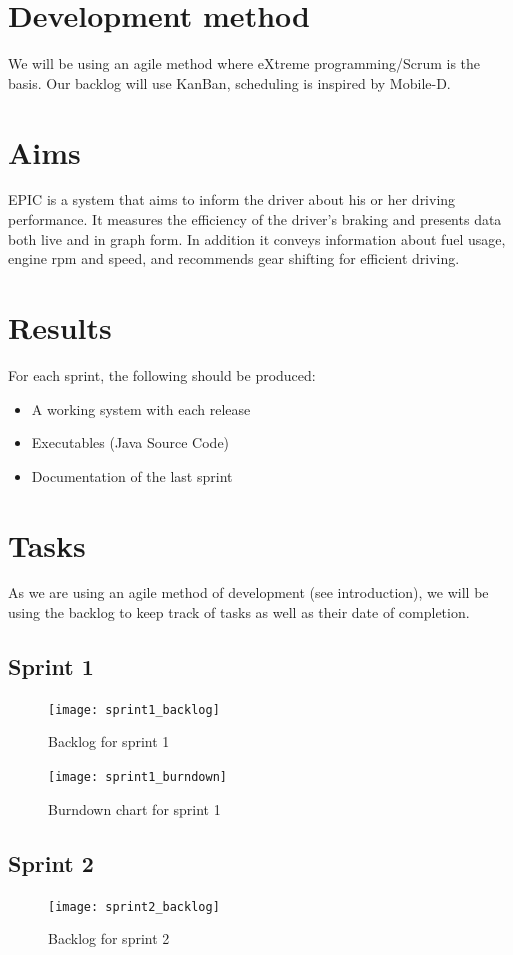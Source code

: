 \documentclass[a4paper,12pt]{article}
\begin{document}
\section{Development method}
We will be using an agile method where eXtreme programming/Scrum is the basis. Our backlog will use KanBan, scheduling is inspired by Mobile-D.

\section{Aims}
EPIC is a system that aims to inform the driver about his or her driving performance. It measures the efficiency of the driver’s braking and presents data both live and in graph form. In addition it conveys information about fuel usage, engine rpm and speed, and recommends gear shifting for efficient driving.

\section{Results}
For each sprint, the following should be produced:
\begin{itemize}
	\item A working system with each release
	\item Executables (Java Source Code)
	\item Documentation of the last sprint
\end{itemize}

\section{Tasks}
As we are using an agile method of development (see introduction), we will be using the backlog to keep track of tasks as well as their date of completion.

\subsection{Sprint 1}
\begin{figure}[H]
	\centering
	\texttt{[image: sprint1\_backlog]}
	\caption{Backlog for sprint 1}
\end{figure}

\begin{figure}[H]
	\centering
	\texttt{[image: sprint1\_burndown]}
	\caption{Burndown chart for sprint 1}
\end{figure}

\subsection{Sprint 2}
\begin{figure}[H]
	\centering
	\texttt{[image: sprint2\_backlog]}
	\caption{Backlog for sprint 2}
\end{figure}
\end{document}
